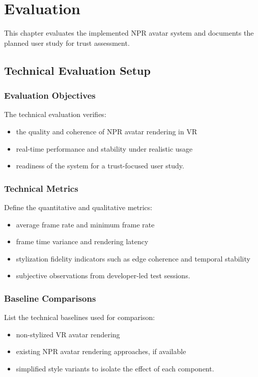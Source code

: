 \chapter{Evaluation}
\label{ch:evaluation}

This chapter evaluates the implemented NPR avatar system and documents the planned user study for trust assessment.

\section{Technical Evaluation Setup}
\label{sec:technical_setup}

\subsection{Evaluation Objectives}

The technical evaluation verifies:
\begin{itemize}
  \item the quality and coherence of NPR avatar rendering in VR
  \item real-time performance and stability under realistic usage
  \item readiness of the system for a trust-focused user study.
\end{itemize}

\subsection{Technical Metrics}

Define the quantitative and qualitative metrics:
\begin{itemize}
  \item average frame rate and minimum frame rate
  \item frame time variance and rendering latency
  \item stylization fidelity indicators such as edge coherence and temporal stability
  \item subjective observations from developer-led test sessions.
\end{itemize}

\subsection{Baseline Comparisons}

List the technical baselines used for comparison:
\begin{itemize}
  \item non-stylized VR avatar rendering
  \item existing NPR avatar rendering approaches, if available
  \item simplified style variants to isolate the effect of each component.
\end{itemize}

